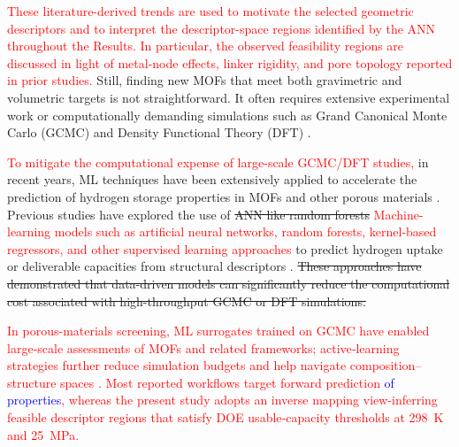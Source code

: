 \documentclass[review]{elsarticle}
\begin{document}
\textcolor{red}{These literature-derived trends are used to motivate the 
selected geometric descriptors and to interpret the descriptor-space regions 
identified by the ANN throughout the Results. In particular, the observed 
feasibility regions are discussed in light of metal-node effects, linker 
rigidity, and pore topology reported in prior studies.} Still, finding new MOFs 
that meet both gravimetric and volumetric targets is not straightforward. It 
often requires extensive experimental work or computationally demanding 
simulations such as Grand Canonical Monte Carlo (GCMC) and Density Functional 
Theory (DFT) \cite{ltc24,cltgv21}. 

\textcolor{red}{To mitigate the computational expense of large-scale GCMC/DFT 
studies,} in recent years, ML techniques have been extensively applied to 
accelerate the prediction of hydrogen storage properties in MOFs and other 
porous materials \textcolor{red}{\cite{bdci+18,wfzz+24,sg20,ylbt+25}}. Previous 
studies have explored the use of \sout{ANN like random forests} 
\textcolor{red}{Machine-learning models such as artificial neural networks, 
random forests, kernel-based regressors, and other supervised learning 
approaches \cite{moc23,ofcg+24}} to predict hydrogen uptake or deliverable 
capacities from structural descriptors \cite{wwyq25,cbc+25,qxx+24,sra23,gm21,
as21,aaps25,sc24}. \sout{These approaches have demonstrated that data-driven 
models can significantly reduce the computational cost associated with 
high-throughput GCMC or DFT simulations.}

\textcolor{red}{In porous-materials screening, ML surrogates trained on GCMC 
have enabled large‑scale assessments of MOFs and related frameworks; 
active‑learning strategies further reduce simulation budgets and help navigate 
composition–structure spaces \cite{adpw+19,gsi+18,moc23,ofcg+24,bdci+18,
wfzz+24,sg20,klk20,sc24,klaf+25}. Most reported workflows target forward 
prediction \textcolor{blue}{of properties}, whereas the present study adopts 
an inverse mapping view-inferring 
feasible descriptor regions that satisfy DOE usable‑capacity thresholds at 
298~K and 25~MPa.}
 
\end{document}
